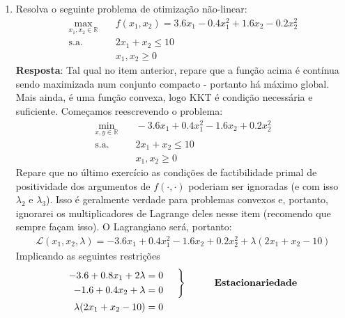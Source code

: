 \begin{enumerate}
{\begin{enumerate}
\begin{enumerate}
            \end{enumerate}
        \end{enumerate}
        }
    \item[2)] Resolva o seguinte problema de otimização não-linear:
    \begin{align*}
        \max_{x_1,x_2\in\mathbb{R}}&\quad f(x_1,x_2)=3.6x_1 -0.4x_1^2+1.6x_2-0.2x_2^2\\
        \text{s.a.}&\quad 2x_1 + x_2\le10\\
        &\quad x_1,x_2\ge0
    \end{align*}
    \textbf{Resposta}:
    \textcolor{magentao}{
    Tal qual no item anterior, repare que a função acima é contínua sendo maximizada num conjunto compacto - portanto há máximo global. Mais ainda, é uma função convexa, logo KKT é condição necessária e suficiente. Começamos reescrevendo o problema:
    \begin{align*}
            \min_{x,y\in\mathbb{R}}&\quad-3.6x_1 +0.4x_1^2-1.6x_2+0.2x_2^2\\
            \text{s.a.}&\quad 2x_1 + x_2\le10\\
            &\quad x_1,x_2\ge0
    \end{align*}
    Repare que no último exercício as condições de factibilidade primal de positividade dos argumentos de $f(\cdot,\cdot)$ poderiam ser ignoradas (e com isso $\lambda_2$ e $\lambda_3$). Isso é geralmente verdade para problemas convexos e, portanto, ignorarei os multiplicadores de Lagrange deles nesse item (recomendo que sempre façam isso). O Lagrangiano será, portanto:
    \begin{align*}
        \mathcal{L}(x_1,x_2,\lambda) =  -3.6x_1 +0.4x_1^2-1.6x_2+0.2x_2^2 + \lambda(2x_1 + x_2-10)
    \end{align*}
    Implicando as seguintes restrições
    \begin{align*}
        \begin{aligned}
        -3.6+0.8x_1+2\lambda = 0\\
        -1.6 +0.4x_2+\lambda=0 
        \end{aligned} &&
        \left. \begin{aligned}
           \text{ }\\
           \text{ }
        \end{aligned}  \right\rbrace && \qquad \text{\textbf{Estacionariedade}}\\
        \begin{aligned}
            \lambda(2x_1 + x_2-10)=0
        \end{aligned} &&

\end{align*}}
\end{enumerate}
